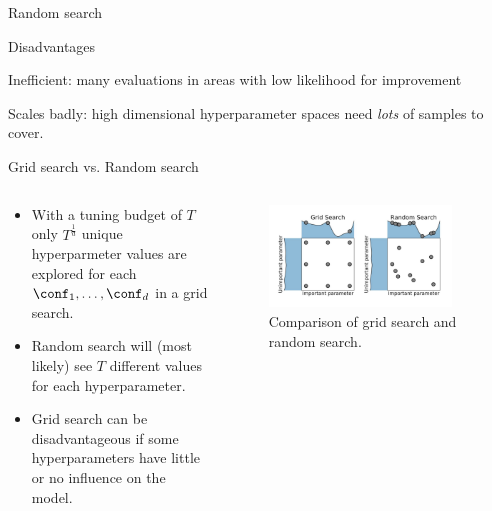 \begin{frame}{Random search}
\begin{blocki}{Disadvantages}
\item Inefficient: many evaluations in areas with low likelihood for improvement
\item Scales badly: high dimensional hyperparameter spaces need \emph{lots} of samples to cover.
\end{blocki}
\end{frame}

\begin{frame}{Grid search vs. Random search}

\begin{columns}
\begin{column}{0.49\textwidth}
\begin{itemize}
    \item With a tuning budget of $T$ only $T^{\frac{1}{d}}$ unique hyperparmeter values are explored for each $\conf_1, \dots, \conf_d$ in a grid search.
    \item Random search will (most likely) see $T$ different values for each hyperparameter.
    \item Grid search can be disadvantageous if some hyperparameters have little or no influence on the model.
\end{itemize}
\end{column}
\begin{column}{0.49\textwidth}
\vspace*{-0.8cm}
\begin{center}
\begin{figure}
\includegraphics[width=0.9\textwidth]{images/rsvsgs.pdf}
    \caption*{Comparison of grid search and random search. }
\end{figure}
\end{center}
\end{column}
\end{columns}

\end{frame}


